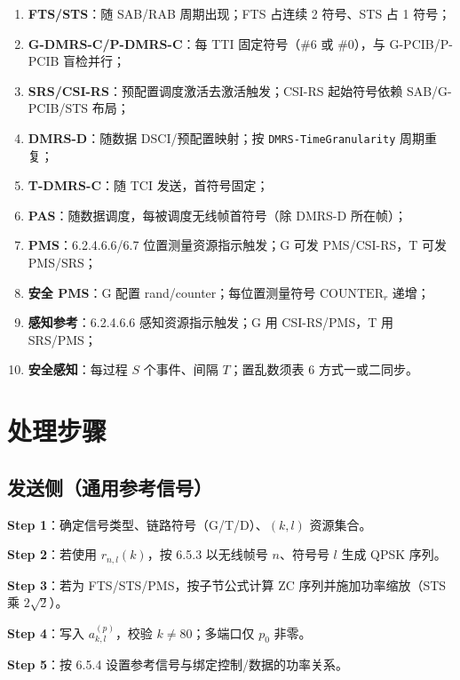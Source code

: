 \documentclass[11pt,a4paper]{ctexart}
\begin{document}
\begin{enumerate}[nosep]
  \item \textbf{FTS/STS}：随 SAB/RAB 周期出现；FTS 占连续 2 符号、STS 占 1 符号；
  \item \textbf{G-DMRS-C/P-DMRS-C}：每 TTI 固定符号（\#6 或 \#0），与 G-PCIB/P-PCIB 盲检并行；
  \item \textbf{SRS/CSI-RS}：预配置调度激活去激活触发；CSI-RS 起始符号依赖 SAB/G-PCIB/STS 布局；
  \item \textbf{DMRS-D}：随数据 DSCI/预配置映射；按 \texttt{DMRS-TimeGranularity} 周期重复；
  \item \textbf{T-DMRS-C}：随 TCI 发送，首符号固定；
  \item \textbf{PAS}：随数据调度，每被调度无线帧首符号（除 DMRS-D 所在帧）；
  \item \textbf{PMS}：6.2.4.6.6/6.7 位置测量资源指示触发；G 可发 PMS/CSI-RS，T 可发 PMS/SRS；
  \item \textbf{安全 PMS}：G 配置 rand/counter；每位置测量符号 $\mathrm{COUNTER}_r$ 递增；
  \item \textbf{感知参考}：6.2.4.6.6 感知资源指示触发；G 用 CSI-RS/PMS，T 用 SRS/PMS；
  \item \textbf{安全感知}：每过程 $S$ 个事件、间隔 $T$；置乱数须表 6 方式一或二同步。
\end{enumerate}

\section{处理步骤}

\subsection{发送侧（通用参考信号）}

\textbf{Step 1}：确定信号类型、链路符号（G/T/D）、$(k,l)$ 资源集合。

\textbf{Step 2}：若使用 $r_{n,l}(k)$，按 6.5.3 以无线帧号 $n$、符号号 $l$ 生成 QPSK 序列。

\textbf{Step 3}：若为 FTS/STS/PMS，按子节公式计算 ZC 序列并施加功率缩放（STS 乘 $2\sqrt{2}$）。

\textbf{Step 4}：写入 $a_{k,l}^{(p)}$，校验 $k{\neq}80$；多端口仅 $p_0$ 非零。

\textbf{Step 5}：按 6.5.4 设置参考信号与绑定控制/数据的功率关系。
\end{document}
